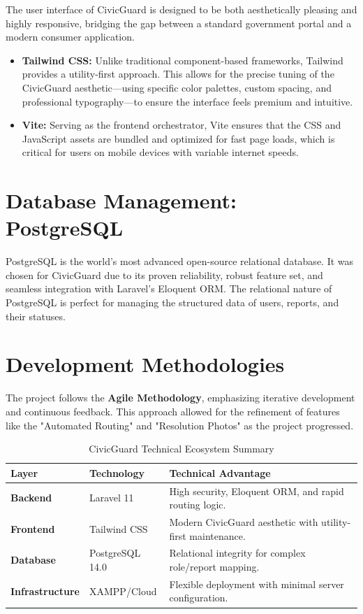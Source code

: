 The user interface of CivicGuard is designed to be both aesthetically pleasing and highly responsive, bridging the gap between a standard government portal and a modern consumer application.
\begin{itemize}
    \item \textbf{Tailwind CSS:} Unlike traditional component-based frameworks, Tailwind provides a utility-first approach. This allows for the precise tuning of the CivicGuard aesthetic—using specific color palettes, custom spacing, and professional typography—to ensure the interface feels premium and intuitive.
    \item \textbf{Vite:} Serving as the frontend orchestrator, Vite ensures that the CSS and JavaScript assets are bundled and optimized for fast page loads, which is critical for users on mobile devices with variable internet speeds.
\end{itemize}

\section{Database Management: PostgreSQL}
PostgreSQL is the world's most advanced open-source relational database. It was chosen for CivicGuard due to its proven reliability, robust feature set, and seamless integration with Laravel's Eloquent ORM. The relational nature of PostgreSQL is perfect for managing the structured data of users, reports, and their statuses.

\section{Development Methodologies}
The project follows the \textbf{Agile Methodology}, emphasizing iterative development and continuous feedback. This approach allowed for the refinement of features like the "Automated Routing" and "Resolution Photos" as the project progressed.

\begin{table}[H]
\centering
\renewcommand{\arraystretch}{1.5}
\begin{tabular}{|p{4cm}|p{3cm}|p{7cm}|}
\hline
\textbf{Layer} & \textbf{Technology} & \textbf{Technical Advantage} \\ \hline
\textbf{Backend} & Laravel 11 & High security, Eloquent ORM, and rapid routing logic. \\ \hline
\textbf{Frontend} & Tailwind CSS & Modern CivicGuard aesthetic with utility-first maintenance. \\ \hline
\textbf{Database} & PostgreSQL 14.0 & Relational integrity for complex role/report mapping. \\ \hline
\textbf{Infrastructure} & XAMPP/Cloud & Flexible deployment with minimal server configuration. \\ \hline
\end{tabular}
\caption{CivicGuard Technical Ecosystem Summary}
\label{tab:tech_stack}
\end{table}
